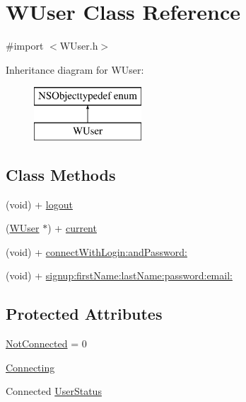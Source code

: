 \hypertarget{interface_w_user}{\section{W\-User Class Reference}
\label{interface_w_user}
}


{\ttfamily \#import $<$W\-User.\-h$>$}

Inheritance diagram for W\-User\-:\begin{figure}[H]
\begin{center}
\leavevmode
\includegraphics[height=2.000000cm]{interface_w_user}
\end{center}
\end{figure}
\subsection*{Class Methods}
\begin{DoxyCompactItemize}
\item 
(void) + \hyperlink{interface_w_user_a1d09fbcf3db3306102cfaca38cdef52c}{logout}
\item 
(\hyperlink{interface_w_user}{W\-User} $\ast$) + \hyperlink{interface_w_user_a64e945b5a2369deeb10863a8b2da88b4}{current}
\item 
(void) + \hyperlink{interface_w_user_ad2c06066b38a027578a5fb98e3d178a6}{connect\-With\-Login\-:and\-Password\-:}
\item 
(void) + \hyperlink{interface_w_user_aa4e75794216c587e5905bf96b4848f44}{signup\-:first\-Name\-:last\-Name\-:password\-:email\-:}
\end{DoxyCompactItemize}
\subsection*{Protected Attributes}
\begin{DoxyCompactItemize}
\item 
\hyperlink{interface_w_user_aeb586fdedc7737f46fdc62f4db5a13f8}{Not\-Connected} = 0
\item 
\hyperlink{interface_w_user_a1469e26a4f64967c3602f8ee5ae2acb1}{Connecting}
\item 
Connected \hyperlink{interface_w_user_a5e79d8246a2ab96a7280c1d7aa5819d5}{User\-Status}
\end{DoxyCompactItemize}
